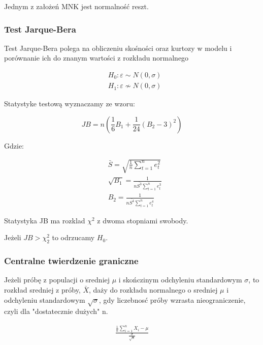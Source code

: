 Jednym z założeń MNK jest normalność reszt.

\subsubsection{Test Jarque-Bera}
Test Jarque-Bera polega na obliczeniu skośności oraz kurtozy w modelu i porównanie ich do znanym wartości z rozkładu normalnego

\begin{equation}
    \begin{split}
        &H_0: \varepsilon \sim N(0,\sigma) \\
        &H_1: \varepsilon \not\sim N(0,\sigma)
    \end{split}
\end{equation}

Statystyke testową wyznaczamy ze wzoru:

\begin{equation}
    JB = n \left(\frac{1}{6}B_1 + \frac{1}{24}(B_2 -3)^2\right)
\end{equation}

Gdzie:

\begin{equation}
    \begin{split}
        &\bar{S} = \sqrt{\frac{1}{n}\sum_{t=1}^{n}e^2_t} \\
        &\sqrt{B_1} = \frac{1}{n\bar{S^3}\sum_{t=1}^{n}e^3_t}  \\
        & B_2 = \frac{1}{n\bar{S^4}\sum_{t=1}^{n}{e^4_t}}
    \end{split}
\end{equation}

Statystyka JB ma rozklad \(\chi^2\) z dwoma stopniami swobody.

Jeżeli \(JB > \chi^2_2\) to odrzucamy \(H_0\).

\subsubsection{Centralne twierdzenie graniczne}

Jeżeli próbę z populacji o sredniej \(\mu\) i skończinym odchyleniu standardowym \(\sigma \), to rozkład sredniej z próby, \(\bar{X}\), daży do rozkładu normalnego o sredniej \(\mu\) i odchyleniu standardowym \(\sqrt{\sigma} \), gdy liczebnosć próby wzrasta nieograniczenie, czyli dla "dostatecznie dużych" n.

\begin{equation}
    \begin{split}
        \frac{\frac{1}{n} \sum_{i=1}^{n} X_i - \mu}{\frac{\sigma}{\sqrt{n}}}
    \end{split}
\end{equation}

